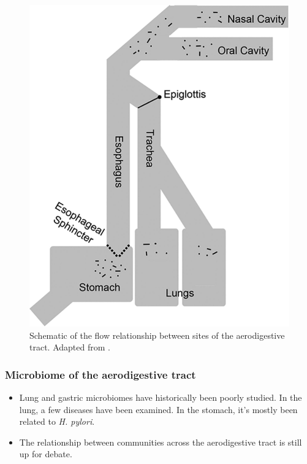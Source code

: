 \documentclass[12pt]{article}
\begin{document}
\begin{figure}[H]
\begin{center}
    \includegraphics[scale=0.35]{aero_tract}
    \caption{Schematic of the flow relationship between sites of the 
    aerodigestive tract. Adapted from \cite{bassis-source-2015}.}\label{fig:aero_tract}
\end{center}
\end{figure}

\subsubsection{Microbiome of the aerodigestive tract}
\begin{itemize}
\item Lung and gastric microbiomes have historically been poorly studied. In the lung, a few diseases have been examined. In the stomach, it's mostly been related to \textit{H. pylori}.
\item The relationship between communities across the aerodigestive tract is still up for debate.
\end{itemize}
\end{document}

